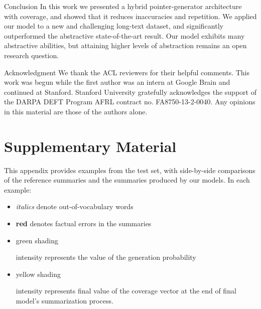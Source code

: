 \documentclass[11pt,a4paper]{article}
\newcommand{\hlpgen}[2]{\fboxsep1pt \colorbox{ggreen!#2}{\strut #1}} \newcommand{\hlcov}[2]{\fboxsep1pt \colorbox{gyellow!#2}{\strut #1}} \newcommand{\error}[1]{\textcolor{gred}{\textbf{#1}}} \newcommand{\fph}[1]{\textcolor{gblue}{\textbf{#1}}} \newcommand{\reph}[1]{\textcolor{ggreen}{\textbf{#1}}} \newcommand{\novelh}[1]{\textcolor{gblue}{\textbf{#1}}}
\begin{document}
\begin{section}{Conclusion}
In this work we presented a hybrid pointer-generator architecture with coverage, and showed that it reduces inaccuracies and repetition.
We applied our model to a new and challenging long-text dataset, and significantly outperformed the abstractive state-of-the-art result.
Our model exhibits many abstractive abilities, but attaining higher levels of abstraction remains an open research question.
\end{section}

\begin{section}{Acknowledgment}
We thank the ACL reviewers for their helpful comments.
This work was begun while the first author was an intern at Google Brain and continued at Stanford. Stanford University gratefully acknowledges the support of the DARPA DEFT Program AFRL contract no. FA8750-13-2-0040. Any opinions in this material are those of the authors alone.
\end{section}

\clearpage
\newpage



\clearpage
\newpage

\appendix
\onecolumn
\section*{Supplementary Material}
This appendix provides examples from the test set, with side-by-side comparisons of the reference summaries and the summaries produced by our models.
In each example:
\begin{itemize}
\item \textit{italics} denote out-of-vocabulary words
\item \error{red} denotes factual errors in the summaries
\item \hlpgen{green shading}{30} intensity represents the value of the generation probability 
\item \hlcov{yellow shading}{30} intensity represents final value of the coverage vector at the end of final model's summarization process.
\end{itemize}
\end{document}
